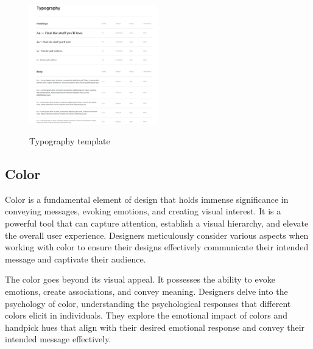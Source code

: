 \begin{figure}[htbp]
  \centering
  \includegraphics[width=0.5\textwidth]{Graphics/Design/Typograpghty/image.png}
  \caption{Typography template}
  \cite{fling2009mobile}
\end{figure}




\subsection{Color}

Color is a fundamental element of design that holds immense significance in conveying messages, evoking emotions, and creating visual interest. It is a powerful tool that can capture attention, establish a visual hierarchy, and elevate the overall user experience. Designers meticulously consider various aspects when working with color to ensure their designs effectively communicate their intended message and captivate their audience.

The color goes beyond its visual appeal. It possesses the ability to evoke emotions, create associations, and convey meaning. Designers delve into the psychology of color, understanding the psychological responses that different colors elicit in individuals. They explore the emotional impact of colors and handpick hues that align with their desired emotional response and convey their intended message effectively.


